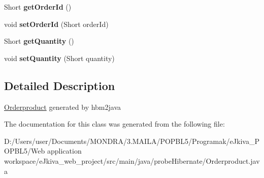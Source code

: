 \begin{DoxyCompactItemize}
\mbox{\label{classprobe_hibernate_1_1_orderproduct_add795cd4921b667a33f559627e101ad0}} 
Short {\bfseries get\+Order\+Id} ()
\item 
\mbox{\label{classprobe_hibernate_1_1_orderproduct_a456b31f1924d770324629fc325e50b81}} 
void {\bfseries set\+Order\+Id} (Short order\+Id)
\item 
\mbox{\label{classprobe_hibernate_1_1_orderproduct_a14c5694ca3ab9c155d1593bbe49cb393}} 
Short {\bfseries get\+Quantity} ()
\item 
\mbox{\label{classprobe_hibernate_1_1_orderproduct_ade2b768242450f74479b4172ecac48c1}} 
void {\bfseries set\+Quantity} (Short quantity)
\end{DoxyCompactItemize}


\subsection{Detailed Description}
\mbox{\hyperlink{classprobe_hibernate_1_1_orderproduct}{Orderproduct}} generated by hbm2java 

The documentation for this class was generated from the following file\+:\begin{DoxyCompactItemize}
\item 
D\+:/\+Users/user/\+Documents/\+M\+O\+N\+D\+R\+A/3.\+M\+A\+I\+L\+A/\+P\+O\+P\+B\+L5/\+Programak/e\+Jkiva\+\_\+\+P\+O\+P\+B\+L5/\+Web application workspace/e\+Jkiva\+\_\+web\+\_\+project/src/main/java/probe\+Hibernate/Orderproduct.\+java\end{DoxyCompactItemize}
